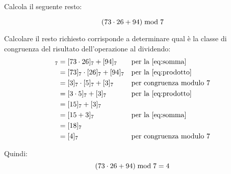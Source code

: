     \begin{esercizio}
        Calcola il seguente resto:

        \begin{equation*}
            (73 \cdot 26 + 94)  \bmod  7
        \end{equation*}
    \end{esercizio}    
    \begin{soluzione}
        Calcolare il resto richiesto corrisponde a determinare qual è la classe di congruenza del risultato dell'operazione al dividendo:
        \begin{align*}
            [73 \cdot 26 + 94]_7 &= [73 \cdot 26]_7 + [94]_7 &&\text{per la~\eqref{eq:somma}} \\
            &= [73]_7 \cdot [26]_7 + [94]_7 &&\text{per la~\eqref{eq:prodotto}} \\
            &= [3]_7 \cdot [5]_7 + [3]_7 &&\text{per congruenza modulo 7} \\
            &= [3 \cdot 5]_7 + [3]_7 &&\text{per la~\eqref{eq:prodotto}} \\
            &= [15]_7 + [3]_7 \\
            &= [15 + 3]_7 &&\text{per la~\eqref{eq:somma}} \\
            &= [18]_7 \\
            &= [4]_7 &&\text{per congruenza modulo 7}
        \end{align*}

        Quindi:
        \begin{equation*}
            (73 \cdot 26 + 94)  \bmod  7 = 4
        \end{equation*}
    \end{soluzione}
